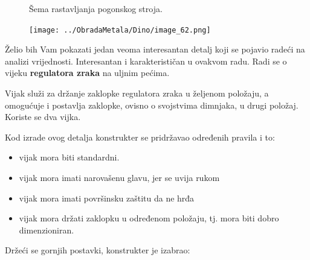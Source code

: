 \documentclass[a4paper,12pt]{article}
\numberwithin{figure}{section}
\begin{document}
\begin{landscape}
\begin{figure}

\caption{Šema rastavljanja pogonskog stroja.}\label{Slika2}
\end{figure}
\end{landscape}
\clearpage
\begin{figure}[!h]
\centering
\texttt{[image: ../ObradaMetala/Dino/image\_62.png]}
\end{figure}
\FloatBarrier

Želio bih Vam pokazati jedan veoma interesantan detalj koji se pojavio radeći na analizi vrijednosti. Interesantan i karakterističan u ovakvom radu. Radi se o vijeku \textbf{regulatora zraka} na uljnim pećima.\par

Vijak služi za držanje zaklopke regulatora zraka u željenom položaju, a omogućuje i postavlja zaklopke, ovisno o svojstvima dimnjaka, u drugi položaj. Koriste se dva vijka.\par
Kod izrade ovog detalja konstrukter se pridržavao određenih pravila i to:
\begin{itemize}
\item vijak mora biti standardni.
\item vijak mora imati narovašenu glavu, jer se uvija rukom
\item vijak mora imati površinsku zaštitu da ne hrđa
\item vijak mora držati zaklopku u određenom položaju, tj. mora biti dobro dimenzioniran.
\end{itemize}
Držeći se gornjih postavki, konstrukter je izabrao:
\end{document}
